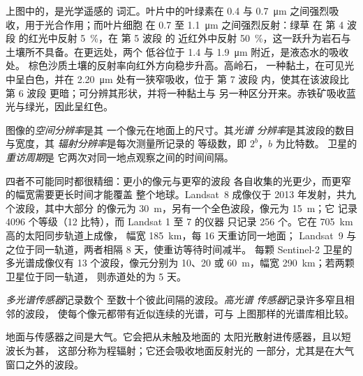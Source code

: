 上图中的，是光学遥感的
词汇。叶片中的叶绿素在 0.4 与
\qty{0.7}{\micro\metre} 之间强烈吸收，用于光合作用；而叶片细胞
在 0.7 至 \qty{1.1}{\micro\metre} 之间强烈反射：绿草
在 第 4 波段 的红光中反射 \qty{5}{\percent}，在 第 5 波段 的
近红外中反射 \qty{50}{\percent}，这一跃升为岩石与土壤所不具备。在更远处，两个
低谷位于 1.4 与 \qty{1.9}{\micro\metre} 附近，是液态水的吸收处。
棕色沙质土壤的反射率向红外方向稳步升高。高岭石，
一种黏土，在可见光中呈白色，并在
\qty{2.20}{\micro\metre} 处有一狭窄吸收，位于 第 7 波段 内，使其在该波段比
第 6 波段 更暗；可分辨其形状，并将一种黏土与
另一种区分开来。赤铁矿吸收蓝光与绿光，因此呈红色。

\begin{definition}\label{def:b3:remote-sensing-gis:resolutions}
图像的\emph{空间分辨率}是其
一个像元在地面上的尺寸。其\emph{光谱
分辨率}是其波段的数目与宽度，其
\emph{辐射分辨率}是每次测量所记录的
等级数，即 $2^b$，$b$ 为比特数。
卫星的\emph{重访周期}是
它两次对同一地点观察之间的时间间隔。
\end{definition}

四者不可能同时都很精细：更小的像元与更窄的波段
各自收集的光更少，而更窄的幅宽需要更长时间才能覆盖
整个地球。Landsat~8 成像仪于 2013 年发射，共九个波段，其中大部分
的像元为 \qty{30}{m}，另有一个全色波段，像元为 \qty{15}{m}；它
记录 4096 个等级（12 比特），而 Landsat 1 至 7 的仪器
只记录 256 个。它在 \qty{705}{km} 高的太阳同步轨道上成像，
幅宽 \qty{185}{km}，每 16 天重访同一地面；
Landsat~9 与之位于同一轨道，两者相隔 8 天，使重访等待时间减半。
每颗 Sentinel-2 卫星的多光谱成像仪有 13 个波段，像元分别为 10、20
或 \qty{60}{m}，幅宽 \qty{290}{km}；若两颗卫星位于同一轨道，
则赤道处的为 5 天。

\begin{definition}[多光谱与高光谱传感器]\label{def:b3:remote-sensing-gis:sensors}
\emph{多光谱传感器}记录数个
至数十个彼此间隔的波段。\emph{高光谱
传感器}记录许多窄且相邻的波段，
使每个像元都带有近似连续的光谱，可与
上图那样的光谱库相比较。
\end{definition}

地面与传感器之间是大气。它会把从未触及地面的
太阳光散射进传感器，且以短波长为甚，
这部分称为程辐射；它还会吸收地面反射光的
一部分，尤其是在大气窗口之外的波段。

